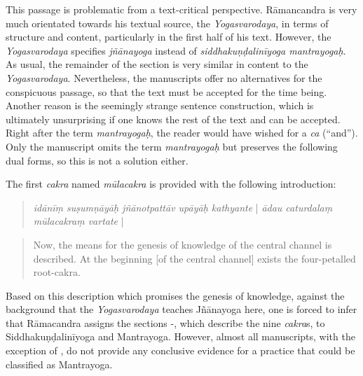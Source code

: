 This passage is problematic from a text-critical perspective. Rāmancandra is very much orientated towards his textual source, the \textit{Yogasvarodaya}, in terms of structure and content, particularly in the first half of his text. However, the \textit{Yogasvarodaya} specifies \textit{jñānayoga} instead of \textit{siddhakuṇḍalinīyoga mantrayogaḥ}. As usual, the remainder of the section is very similar in content to the \textit{Yogasvarodaya}. Nevertheless, the manuscripts offer no alternatives for the conspicuous passage, so that the text must be accepted for the time being. Another reason is the seemingly strange sentence construction, which is ultimately unsurprising if one knows the rest of the text and can be accepted. Right after the term \textit{mantrayogaḥ}, the reader would have wished for a \textit{ca} (``and''). Only the manuscript  omits the term \textit{mantrayogaḥ} but preserves the following dual forms, so this is not a solution either.    

The first \textit{cakra} named \textit{mūlacakra} is provided with the following introduction:

\begin{quote}
  \textit{idānīṃ suṣumṇāyāḥ jñānotpattāv upāyāḥ kathyante} | \textit{ādau caturdalaṃ mūlacakraṃ vartate} | 
\end{quote}
\begin{quote}
  Now, the means for the genesis of knowledge of the central channel is described. At the beginning [of the central channel] exists the four-petalled root-cakra.
  \end{quote}

Based on this description which promises the genesis of knowledge, against the background that the \emph{Yogasvarodaya} teaches Jñānayoga here, one is forced to infer that Rāmacandra assigns the sections -, which describe the nine \textit{cakra}s, to Siddhakuṇḍalinīyoga and Mantrayoga. However, almost all manuscripts, with the exception of , do not provide any conclusive evidence for a practice that could be classified as Mantrayoga.

